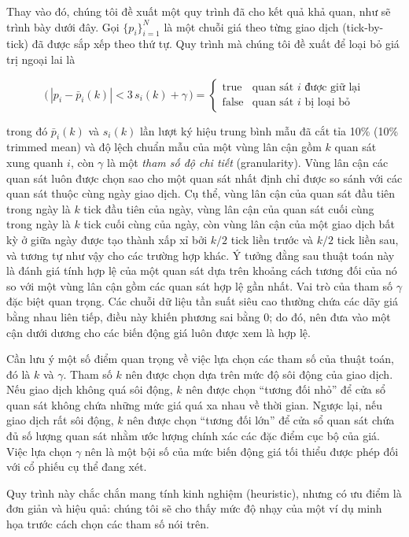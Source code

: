 Thay vào đó, chúng tôi đề xuất một quy trình đã cho kết quả khả quan, như sẽ trình bày dưới đây. Gọi $\{p_i\}_{i=1}^{N}$ là một chuỗi giá theo từng giao dịch (tick-by-tick) đã được sắp xếp theo thứ tự. Quy trình mà chúng tôi đề xuất để loại bỏ giá trị ngoại lai là

\[
\big(\,|p_i - \bar{p}_i(k)| < 3\,s_i(k) + \gamma\,\big) =
\begin{cases}
\text{true} & \text{quan sát } i \text{ được giữ lại} \\
\text{false} & \text{quan sát } i \text{ bị loại bỏ}
\end{cases}
\]

trong đó $\bar p_i(k)$ và $s_i(k)$ lần lượt ký hiệu trung bình mẫu đã cắt tỉa 10\% (10\% trimmed mean) và độ lệch chuẩn mẫu của một vùng lân cận gồm $k$ quan sát xung quanh $i$, còn $\gamma$ là một \textit{tham số độ chi tiết} (granularity). Vùng lân cận các quan sát luôn được chọn sao cho một quan sát nhất định chỉ được so sánh với các quan sát thuộc cùng ngày giao dịch. Cụ thể, vùng lân cận của quan sát đầu tiên trong ngày là $k$ tick đầu tiên của ngày, vùng lân cận của quan sát cuối cùng trong ngày là $k$ tick cuối cùng của ngày, còn vùng lân cận của một giao dịch bất kỳ ở giữa ngày được tạo thành xấp xỉ bởi $k/2$ tick liền trước và $k/2$ tick liền sau, và tương tự như vậy cho các trường hợp khác. Ý tưởng đằng sau thuật toán này là đánh giá tính hợp lệ của một quan sát dựa trên khoảng cách tương đối của nó so với một vùng lân cận gồm các quan sát hợp lệ gần nhất. Vai trò của tham số $\gamma$ đặc biệt quan trọng. Các chuỗi dữ liệu tần suất siêu cao thường chứa các dãy giá bằng nhau liên tiếp, điều này khiến phương sai bằng 0; do đó, nên đưa vào một cận dưới dương cho các biến động giá luôn được xem là hợp lệ.

Cần lưu ý một số điểm quan trọng về việc lựa chọn các tham số của thuật toán, đó là $k$ và $\gamma$. Tham số $k$ nên được chọn dựa trên mức độ sôi động của giao dịch. Nếu giao dịch không quá sôi động, $k$ nên được chọn ``tương đối nhỏ'' để cửa sổ quan sát không chứa những mức giá quá xa nhau về thời gian. Ngược lại, nếu giao dịch rất sôi động, $k$ nên được chọn ``tương đối lớn'' để cửa sổ quan sát chứa đủ số lượng quan sát nhằm ước lượng chính xác các đặc điểm cục bộ của giá. Việc lựa chọn $\gamma$ nên là một bội số của mức biến động giá tối thiểu được phép đối với cổ phiếu cụ thể đang xét.

Quy trình này chắc chắn mang tính kinh nghiệm (heuristic), nhưng có ưu điểm là đơn giản và hiệu quả: chúng tôi sẽ cho thấy mức độ nhạy của một ví dụ minh họa trước cách chọn các tham số nói trên.

